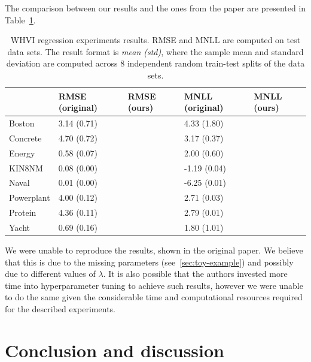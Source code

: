 \documentclass[11pt, twocolumn]{article}
\begin{document}
    The comparison between our results and the ones from the paper are presented in Table~\ref{tab:regression-experiments}.
    \begin{table}[]
    \begin{tabular}{l|llll}
               & RMSE (original) & RMSE (ours) & { }MNLL (original) & MNLL (ours) \\ \hline
    Boston     & 3.14 (0.71)     &             & { }4.33 (1.80)     &             \\
    Concrete   & 4.70 (0.72)     &             & { }3.17 (0.37)     &             \\
    Energy     & 0.58 (0.07)     &             & { }2.00 (0.60)     &             \\
    KIN8NM     & 0.08 (0.00)     &             & -1.19 (0.04)       &             \\
    Naval      & 0.01 (0.00)     &             & -6.25 (0.01)       &             \\
    Powerplant & 4.00 (0.12)     &             & { }2.71 (0.03)     &             \\
    Protein    & 4.36 (0.11)     &             & { }2.79 (0.01)     &             \\
    Yacht      & 0.69 (0.16)     &             & { }1.80 (1.01)     &
    \end{tabular}
    \caption{WHVI regression experiments results. RMSE and MNLL are computed on test data sets. The result format is \textit{mean (std)}, where the sample mean and standard deviation are computed across 8 independent random train-test splits of the data sets.}
    \label{tab:regression-experiments}
    \end{table}
    We were unable to reproduce the results, shown in the original paper.
    We believe that this is due to the missing parameters (see~\ref{sec:toy-example}) and possibly due to different values of $\lambda$.
    It is also possible that the authors invested more time into hyperparameter tuning to achieve such results, however we were unable to do the same given the considerable time and computational resources required for the described experiments.

    \section{Conclusion and discussion}\label{sec:conclusion-and-discussion}

    
    
\end{document}
